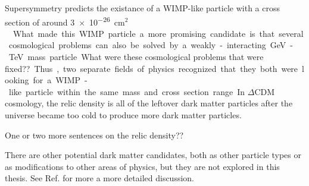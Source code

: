   Supersymmetry predicts the existance of a WIMP-like particle with a cross section of around \nicetilde \SI{3e-26}{cm$^2$}~\cite{Jungman:1995df}.
  What made this WIMP particle a more promising candidate is that several cosmological problems can also be solved by a weakly-interacting GeV-TeV mass particle.
  {\color{red}What were these cosmological problems that were fixed??}
  Thus, two separate fields of physics recognized that they both were looking for a WIMP-like particle within the same mass and cross section range.

  In $\Delta$CDM cosmology, the relic density is all of the leftover dark matter particles after the universe became too cold to produce more dark matter particles.

  {\color{red}One or two more sentences on the relic density??}

  There are other potential dark matter candidates, both as other particle types or as modifications to other areas of physics, but they are not explored in this thesis.
  See Ref. \cite{DMPrimer} for more a more detailed discussion.



